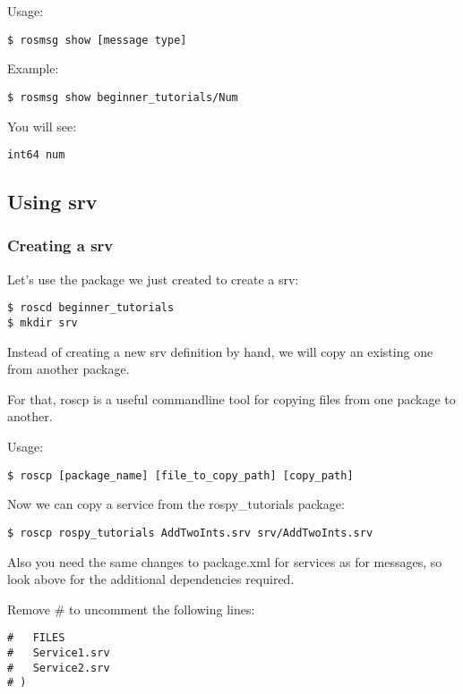 Usage:

\begin{lstlisting}[breaklines=true languages=bash]
$ rosmsg show [message type]
\end{lstlisting}

Example:
\begin{lstlisting}[breaklines=true languages=bash]
$ rosmsg show beginner_tutorials/Num
\end{lstlisting}

You will see:
\begin{lstlisting}[breaklines=true languages=bash]
int64 num
\end{lstlisting}

\subsection{Using srv}
\subsubsection{Creating a srv}

Let's use the package we just created to create a srv:
\begin{lstlisting}[breaklines=true languages=bash]
$ roscd beginner_tutorials
$ mkdir srv
\end{lstlisting}

Instead of creating a new srv definition by hand, we will copy an existing one from another package.

For that, roscp is a useful commandline tool for copying files from one package to another.

Usage:
\begin{lstlisting}[breaklines=true languages=bash]
$ roscp [package_name] [file_to_copy_path] [copy_path]
\end{lstlisting}

Now we can copy a service from the rospy\_tutorials package:
\begin{lstlisting}[breaklines=true languages=bash]
$ roscp rospy_tutorials AddTwoInts.srv srv/AddTwoInts.srv
\end{lstlisting}

Also you need the same changes to package.xml for services as for messages, so look above for the additional dependencies required.

Remove \# to uncomment the following lines:
\begin{lstlisting}[breaklines=true languages=bash]
#   FILES
#   Service1.srv
#   Service2.srv
# )
\end{lstlisting}

